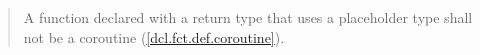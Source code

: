 \begin{quote}
\setcounter{Paras}{14}
\pnum
A function declared with a return type that uses a placeholder type shall not be a coroutine (\ref{dcl.fct.def.coroutine}).
\end{quote}
%
%
%
%
%
%
%
%
%

